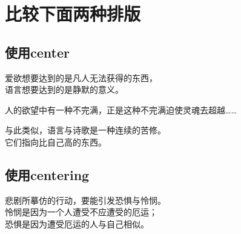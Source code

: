 \documentclass[UTF8]{ctexart}
\begin{document}
\section{比较下面两种排版}

\subsection{使用center}
爱欲想要达到的是凡人无法获得的东西，\\
语言想要达到的是静默的意义。
    \begin{center}
    人的欲望中有一种不完满，正是这种不完满迫使灵魂去超越……
    \end{center}
与此类似，语言与诗歌是一种连续的苦修。\\
它们指向比自己高的东西。

\subsection{使用centering}
\centering
悲剧所摹仿的行动，要能引发恐惧与怜悯。\\
怜悯是因为一个人遭受不应遭受的厄运；\\
恐惧是因为遭受厄运的人与自己相似。
\end{document}

